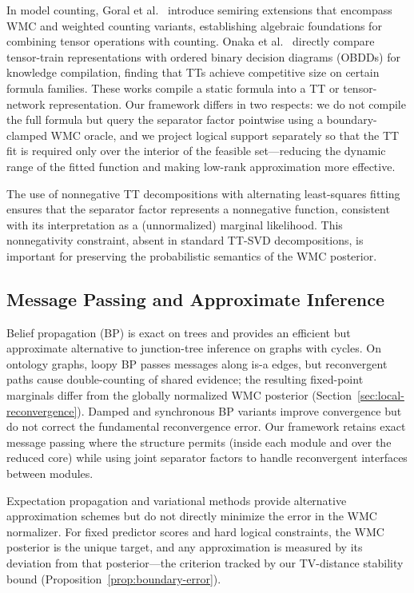 In model counting, Goral et al.\ \citeyearpar{goral2024semiring} introduce
semiring extensions that encompass WMC and weighted counting variants,
establishing algebraic foundations for combining tensor operations with
counting. Onaka et al.\ \citeyearpar{onaka2025ttkc} directly compare
tensor-train representations with ordered binary decision diagrams (OBDDs)
for knowledge compilation, finding that TTs achieve competitive size on
certain formula families. These works compile a static formula into a TT
or tensor-network representation. Our framework differs in two respects:
we do not compile the full formula but query the separator factor
pointwise using a boundary-clamped WMC oracle, and we project logical
support separately so that the TT fit is required only over the
interior of the feasible set---reducing the dynamic range of the fitted
function and making low-rank approximation more effective.

The use of nonnegative TT decompositions with alternating least-squares
fitting \citep{lee2001nmf} ensures that the separator factor represents
a nonnegative function, consistent with its interpretation as a
(unnormalized) marginal likelihood. This nonnegativity constraint, absent
in standard TT-SVD decompositions, is important for preserving the
probabilistic semantics of the WMC posterior.


\subsection{Message Passing and Approximate Inference}

Belief propagation (BP) \citep{pearl1988probabilistic} is exact on
trees and provides an efficient but approximate alternative to junction-tree
inference on graphs with cycles. On ontology graphs, loopy BP passes
messages along is-a edges, but reconvergent paths cause double-counting
of shared evidence; the resulting fixed-point marginals differ from
the globally normalized WMC posterior (Section~\ref{sec:local-reconvergence}).
Damped and synchronous BP variants \citep{murphy1999loopy} improve
convergence but do not correct the fundamental reconvergence error.
Our framework retains exact message passing where the structure permits
(inside each module and over the reduced core) while using joint
separator factors to handle reconvergent interfaces between modules.

Expectation propagation \citep{minka2001ep} and variational methods
\citep{wainwright2008graphical} provide alternative approximation
schemes but do not directly minimize the error in the WMC normalizer.
For fixed predictor scores and hard logical constraints, the
WMC posterior is the unique target, and any approximation is measured
by its deviation from that posterior---the criterion tracked by our
TV-distance stability bound (Proposition~\ref{prop:boundary-error}).


